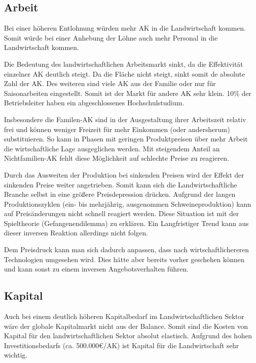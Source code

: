 \documentclass[11pt]{scrartcl}
\begin{document}
\subsection{Arbeit}
Bei einer höheren Entlohnung würden mehr \ac{AK} in die Landwirtschaft kommen.
Somit würde bei einer Anhebung der Löhne auch mehr Personal in die Landwirtschaft kommen.

Die Bedeutung des landwirtschaftlichen Arbeitsmarkt sinkt, da die Effektivität einzelner \ac{AK} deutlich steigt.
Da die Fläche nicht steigt, sinkt somit de absolute Zahl der \ac{AK}.
Des weiteren sind viele \ac{AK} aus der Familie oder nur für Saisonarbeiten eingestellt.
Somit ist der Markt für andere \ac{AK} sehr klein.
10\% der Betriebsleiter haben ein abgeschlossenes Hochschulstudium.

Insbesondere die Familen-\ac{AK} sind in der Ausgestaltung ihrer Arbeitszeit relativ frei und können weniger Freizeit für mehr Einkommen (oder andersherum) substituieren.
So kann in Phasen mit geringen Produktpreisen über mehr Arbeit die wirtschaftliche Lage ausgeglichen werden.
Mit steigendem Anteil an Nichtfamilien-\ac{AK} fehlt diese Möglichkeit auf schlechte Preise zu reagieren.

Durch das Ausweiten der Produktion bei sinkenden Preisen wird der Effekt der sinkenden Preise weiter angetrieben.
Somit kann sich die Landwirtschaftliche Branche selbst in eine größere Preisdepression drücken.
Aufgrund der langen Produktionszyklen (ein- bis mehrjährig, ausgenommen Schweineproduktion) kann auf Preisänderungen nicht schnell reagiert werden.
Diese Situation ist mit der Spieltheorie (Gefangenendilemma) zu erklären.
Ein Langfristiger Trend kann aus dieser inversen Reaktion allerdings nicht folgen.

Dem Preisdruck kann man sich dadurch anpassen, dass nach wirtschaftlichereren Technologien umgesehen wird.
Dies hätte aber bereits vorher geschehen können und kann sonst zu einem inversen Angebotsverhalten führen.

\subsection{Kapital}
Auch bei einem deutlich höheren Kapitalbedarf im Landwirtschaftlichen Sektor wäre der globale Kapitalmarkt nicht aus der Balance.
Somit sind die Kosten von Kapital für den landwirtschaftlichen Sektor absolut elastisch.
Aufgrund des hohen Investitionsbedarfs (ca. 500.000€/\ac{AK}) ist Kapital für die Landwirtschaft sehr wichtig.
\end{document}

